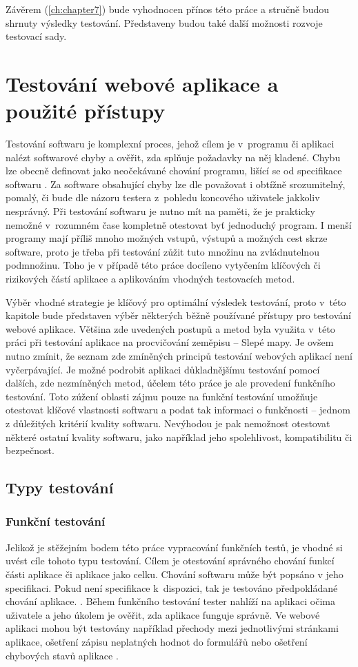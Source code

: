 \documentclass[
    color,   %
	table,   %
    twoside, %
    nolot, nolof
]{fithesis3}
\begin{document}
Závěrem (\ref{ch:chapter7}) bude vyhodnocen přínos této práce a stručně budou shrnuty výsledky testování. Představeny budou také další možnosti rozvoje testovací sady.

\chapter{Testování webové aplikace a použité přístupy}
\label{ch:chapter2}
Testování softwaru je komplexní proces, jehož cílem je v~programu či aplikaci nalézt softwarové chyby a ověřit, zda splňuje požadavky na něj kladené. Chybu lze obecně definovat jako neočekávané chování programu, lišící se od specifikace softwaru \cite{SoftwareISTQB}. Za software obsahující chyby lze dle \cite{Patton} považovat i obtížně srozumitelný, pomalý, či bude dle názoru testera z~pohledu koncového uživatele jakkoliv nesprávný. Při testování softwaru je nutno mít na paměti, že je prakticky nemožné v~rozumném čase kompletně otestovat byť jednoduchý program.  I menší programy mají příliš mnoho možných vstupů, výstupů a možných cest skrze software, proto je třeba při testování zůžit tuto množinu na zvládnutelnou podmnožinu. Toho je v případě této práce docíleno vytyčením klíčových či rizikových částí aplikace a aplikováním vhodných testovacích metod.

Výběr vhodné strategie je klíčový pro optimální výsledek testování, proto v~této kapitole bude představen výběr některých běžně používané přístupy pro testování webové aplikace. Většina zde uvedených postupů a metod byla využita v~této práci při testování aplikace na procvičování zeměpisu – Slepé mapy. Je ovšem nutno zmínit, že seznam zde zmíněných principů testování webových aplikací není vyčerpávající. Je možné podrobit aplikaci důkladnějšímu testování pomocí dalších, zde nezmíněných metod, účelem této práce je ale provedení funkčního testování. Toto zúžení oblasti zájmu pouze na funkční testování umožňuje otestovat klíčové  vlastnosti softwaru a podat tak informaci o funkčnosti – jednom z důležitých kritérií kvality softwaru. Nevýhodou je pak nemožnost otestovat některé ostatní kvality softwaru, jako například jeho spolehlivost, kompatibilitu či bezpečnost.

\section{Typy testování}
\subsection{Funkční testování}
Jelikož je stěžejním bodem této práce vypracování funkčních testů, je vhodné si uvést cíle tohoto typu testování. Cílem je otestování správného chování funkcí části aplikace či aplikace jako celku. Chování softwaru může být popsáno v jeho specifikaci. Pokud není specifikace k~dispozici, tak je testováno předpokládané chování aplikace. \cite{FunctionalISTQB}. Během funkčního testování tester nahlíží na aplikaci očima uživatele a jeho úkolem je ověřit, zda aplikace funguje správně. Ve webové aplikaci mohou být testovány například přechody mezi jednotlivými stránkami aplikace, ošetření zápisu neplatných hodnot do formulářů nebo ošetření chybových stavů aplikace \cite{Patton}.
\end{document}
